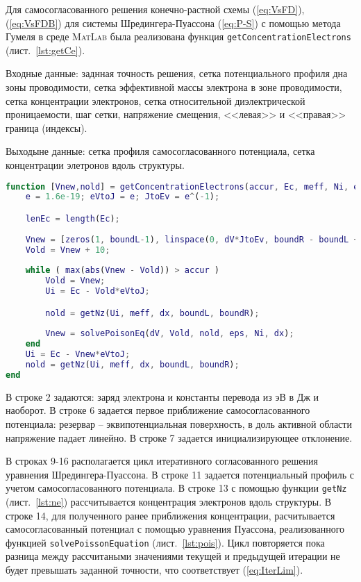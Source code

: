 Для самосогласованного решения конечно-растной схемы (\ref{eq:VsFD}), (\ref{eq:VsFDB}) для системы Шредингера-Пуассона (\ref{eq:P-S}) с помощью метода Гумеля в среде \textsc{MatLab} была реализована функция \texttt{getConcentrationElectrons} (лист.~\ref{lst:getCe}).

Входные данные: заднная точность решения, сетка потенциального профиля дна зоны проводимости, сетка эффективной массы электрона в зоне проводимости, сетка концентрации электронов, сетка относительной диэлектрической проницаемости, шаг сетки, напряжение смещения, <<левая>> и <<правая>> граница (индексы).

Выходыне данные: сетка профиля самосогласованного потенциала, сетка концентрации элетронов вдоль структуры.

\begin{lstlisting}[style=realcode,language=Matlab,caption={Самосогласовванное решение уравнения Шредингера-Пуассона},label={lst:getCe}]
function [Vnew,nold] = getConcentrationElectrons(accur, Ec, meff, Ni, eps, dx, dV, boundL, boundR)
	e = 1.6e-19; eVtoJ = e; JtoEv = e^(-1); 	

	lenEc = length(Ec);
	
	Vnew = [zeros(1, boundL-1), linspace(0, dV*JtoEv, boundR - boundL + 1), dV*JtoEv*ones(1, lenEc - boundR)];
	Vold = Vnew + 10;
	
	while ( max(abs(Vnew - Vold)) > accur )
		Vold = Vnew;
		Ui = Ec - Vold*eVtoJ;

		nold = getNz(Ui, meff, dx, boundL, boundR);
        
        Vnew = solvePoisonEq(dV, Vold, nold, eps, Ni, dx);
	end
	Ui = Ec - Vnew*eVtoJ;
	nold = getNz(Ui, meff, dx, boundL, boundR);
end
\end{lstlisting}
В строке 2 задаются: заряд электрона и константы перевода из эВ в Дж и наоборот. В строке 6 задается первое приближение самосогласованного потенциала: резервар -- эквипотенциальная поверхность, в доль активной области напряжение падает линейно. В строке 7 задается инициализирующее отклонение.

В строках 9-16 располагается цикл итеративного согласованного решения уравнения Шредингера-Пуассона. В строке 11 задается потенциальный профиль с учетом самосогласованного потенциала. В строке 13 с помощью функции \texttt{getNz} (лист.~\ref{lst:ne}) рассчитывается концентрация электронов вдоль структуры. В строке 14, для полученного ранее приближения концентрации, расчитывается самосогласованный потенциал с помощью уравнения Пуассона, реализованного функцией \texttt{solvePoissonEquation} (лист.~\ref{lst:pois}). Цикл повторяется пока разница между рассчитаными значениями текущей и предыдущей итерации не будет превышать заданной точности, что соответствует (\ref{eq:IterLim}).

